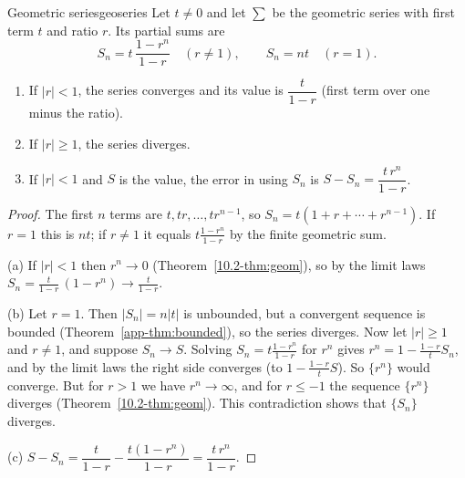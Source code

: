 \documentclass[11pt]{article}
\begin{document}
\begin{thm}{Geometric series}{geoseries}
Let $t\ne0$ and let $\sum$ be the geometric series with first term $t$ and ratio $r$. Its partial sums are
\[
S_n=t\,\frac{1-r^n}{1-r}\quad(r\ne1),\qquad S_n=nt\quad(r=1).
\]
\begin{enumerate}[label=(\alph*)]
  \item If $|r|<1$, the series converges and its value is $\dfrac{t}{1-r}$ (first term over one minus the ratio).
  \item If $|r|\ge1$, the series diverges.
  \item If $|r|<1$ and $S$ is the value, the error in using $S_n$ is $S-S_n=\dfrac{t\,r^n}{1-r}$.
\end{enumerate}
\end{thm}
\begin{proof}
The first $n$ terms are $t,tr,\dots,tr^{n-1}$, so $S_n=t(1+r+\cdots+r^{n-1})$. If $r=1$ this is $nt$; if $r\ne1$ it equals $t\frac{1-r^n}{1-r}$ by the finite geometric sum.

(a) If $|r|<1$ then $r^n\to0$ (Theorem~\ref{10.2-thm:geom}), so by the limit laws $S_n=\frac{t}{1-r}\,(1-r^n)\to\frac t{1-r}$.

(b) Let $r=1$. Then $|S_n|=n|t|$ is unbounded, but a convergent sequence is bounded (Theorem~\ref{app-thm:bounded}), so the series diverges. Now let $|r|\ge1$ and $r\ne1$, and suppose $S_n\to S$. Solving $S_n=t\frac{1-r^n}{1-r}$ for $r^n$ gives $r^n=1-\frac{1-r}tS_n$, and by the limit laws the right side converges (to $1-\frac{1-r}tS$). So $\{r^n\}$ would converge. But for $r>1$ we have $r^n\to\infty$, and for $r\le-1$ the sequence $\{r^n\}$ diverges (Theorem~\ref{10.2-thm:geom}). This contradiction shows that $\{S_n\}$ diverges.

(c) $S-S_n=\dfrac t{1-r}-\dfrac{t(1-r^n)}{1-r}=\dfrac{t\,r^n}{1-r}$.
\end{proof}
\end{document}
